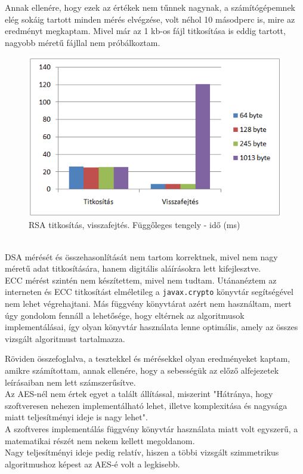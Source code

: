 \noindent Annak ellenére, hogy ezek az értékek nem  tűnnek nagynak, a számítógépemnek elég sokáig tartott minden mérés elvégzése, volt néhol 10 másodperc is, mire az eredményt megkaptam. Mivel már az 1 kb-os fájl titkosítása is eddig tartott, nagyobb méretű fájllal nem próbálkoztam.
\begin{figure}[h]
	\centering
	\includegraphics[scale=0.8]{images/alg_graf_4.png}
	\caption{RSA titkosítás, visszafejtés. Függőleges tengely - idő (ms)}
	\label{fig:rsa_graf}
\end{figure}
\\ \noindent DSA mérését és összehasonlítását nem tartom korrektnek, mivel nem nagy méretű adat titkosítására, hanem digitális aláírásokra lett kifejlesztve.
\vspace{5pt}\\ECC mérést szintén nem készítettem, mivel nem tudtam. Utánanéztem az interneten és ECC titkosítást elméletileg a \texttt{javax.crypto} könyvtár segítségével nem lehet végrehajtani. Más függvény könyvtárat azért nem használtam, mert úgy gondolom fennáll a lehetősége, hogy eltérnek az algoritmusok implementálásai, így olyan könyvtár használata lenne optimális, amely az összes vizsgált algoritmust tartalmazza.



\vspace{15pt}\noindent Röviden összefoglalva, a tesztekkel és mérésekkel olyan eredményeket kaptam, amikre számítottam, annak ellenére, hogy a sebességük az előző alfejezetek leírásaiban nem lett számszerűsítve. 
\\Az AES-nél nem értek egyet a talált állítással, miszerint "Hátránya, hogy szoftveresen nehezen implementálható lehet, illetve komplexitása és nagysága miatt teljesítményi ideje is nagy lehet".
\\A szoftveres implementálás függvény könyvtár használata miatt volt egyszerű, a matematikai részét nem nekem kellett megoldanom.
\\Nagy teljesítményi ideje pedig relatív, hiszen a többi vizsgált szimmetrikus algoritmushoz képest az AES-é volt a legkisebb.